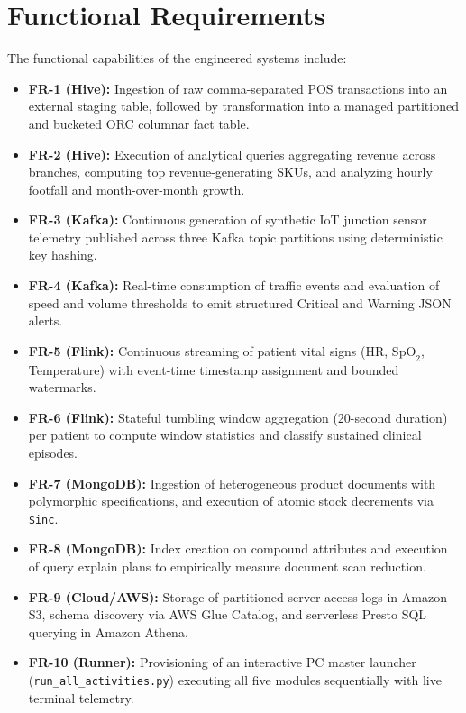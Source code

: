 \documentclass[12pt,a4paper]{report}
\begin{document}
\section{Functional Requirements}
The functional capabilities of the engineered systems include:
\begin{itemize}
    \item \textbf{FR-1 (Hive):} Ingestion of raw comma-separated POS transactions into an external staging table, followed by transformation into a managed partitioned and bucketed ORC columnar fact table.
    \item \textbf{FR-2 (Hive):} Execution of analytical queries aggregating revenue across branches, computing top revenue-generating SKUs, and analyzing hourly footfall and month-over-month growth.
    \item \textbf{FR-3 (Kafka):} Continuous generation of synthetic IoT junction sensor telemetry published across three Kafka topic partitions using deterministic key hashing.
    \item \textbf{FR-4 (Kafka):} Real-time consumption of traffic events and evaluation of speed and volume thresholds to emit structured Critical and Warning JSON alerts.
    \item \textbf{FR-5 (Flink):} Continuous streaming of patient vital signs (HR, $\text{SpO}_2$, Temperature) with event-time timestamp assignment and bounded watermarks.
    \item \textbf{FR-6 (Flink):} Stateful tumbling window aggregation (20-second duration) per patient to compute window statistics and classify sustained clinical episodes.
    \item \textbf{FR-7 (MongoDB):} Ingestion of heterogeneous product documents with polymorphic specifications, and execution of atomic stock decrements via \texttt{\$inc}.
    \item \textbf{FR-8 (MongoDB):} Index creation on compound attributes and execution of query explain plans to empirically measure document scan reduction.
    \item \textbf{FR-9 (Cloud/AWS):} Storage of partitioned server access logs in Amazon S3, schema discovery via AWS Glue Catalog, and serverless Presto SQL querying in Amazon Athena.
    \item \textbf{FR-10 (Runner):} Provisioning of an interactive PC master launcher (\texttt{run\_all\_activities.py}) executing all five modules sequentially with live terminal telemetry.
\end{itemize}
\end{document}
